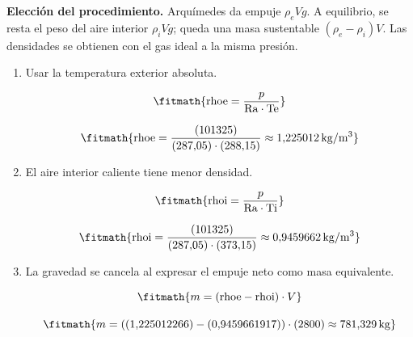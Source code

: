 \noindent\textbf{Elección del procedimiento.} Arquímedes da empuje $\rho_eVg$. A equilibrio, se resta el peso del aire interior $\rho_iVg$; queda una masa sustentable $(\rho_e-\rho_i)V$. Las densidades se obtienen con el gas ideal a la misma presión.

\begin{enumerate}

\item Usar la temperatura exterior absoluta.

\[\fitmath{\mathrm{rhoe}=\frac{p}{\mathrm{Ra}\cdot \mathrm{Te}}}\]

\[\fitmath{\mathrm{rhoe}=\frac{(101325)}{(287{,}05)\cdot (288{,}15)}\approx 1{,}225012\,\mathrm{kg/m^{3}}}\]

\item El aire interior caliente tiene menor densidad.

\[\fitmath{\mathrm{rhoi}=\frac{p}{\mathrm{Ra}\cdot \mathrm{Ti}}}\]

\[\fitmath{\mathrm{rhoi}=\frac{(101325)}{(287{,}05)\cdot (373{,}15)}\approx 0{,}9459662\,\mathrm{kg/m^{3}}}\]

\item La gravedad se cancela al expresar el empuje neto como masa equivalente.

\[\fitmath{m=\left(\mathrm{rhoe}-\mathrm{rhoi}\right)\cdot V}\]

\[\fitmath{m=\left((1{,}225012266)-(0{,}9459661917)\right)\cdot (2800)\approx 781{,}329\,\mathrm{kg}}\]

\end{enumerate}
